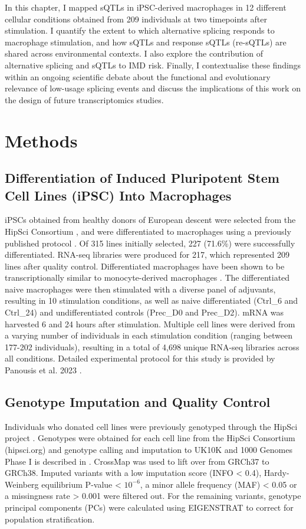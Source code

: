 In this chapter, I mapped sQTLs in iPSC-derived macrophages in 12 different cellular conditions obtained from 209 individuals at two timepoints after stimulation. I quantify the extent to which alternative splicing responds to macrophage stimulation, and how sQTLs and response sQTLs (re-sQTLs) are shared across environmental contexts. I also explore the contribution of alternative splicing and sQTLs to IMD risk. Finally, I contextualise these findings within an ongoing scientific debate about the functional and evolutionary relevance of low-usage splicing events and discuss the implications of this work on the design of future transcriptomics studies. \\
\section{Methods}

\subsection{Differentiation of Induced Pluripotent Stem Cell Lines (iPSC) Into Macrophages}

iPSCs obtained from healthy donors of European descent were selected from the HipSci Consortium \cite{Kilpinen2017-qm}, and were differentiated to macrophages using a previously published protocol \cite{Alasoo2018-pv}. Of 315 lines initially selected, 227 (71.6\%) were successfully differentiated. RNA-seq libraries were produced for 217, which represented 209 lines after quality control. Differentiated macrophages have been shown to be transcriptionally similar to monocyte-derived macrophages \cite{Alasoo2018-pv}. The differentiated naive macrophages were then stimulated with a diverse panel of adjuvants, resulting in 10 stimulation conditions, as well as naive differentiated (Ctrl\_6 and Ctrl\_24) and undifferentiated controls (Prec\_D0 and Prec\_D2). mRNA was harvested 6 and 24 hours after stimulation. Multiple cell lines were derived from a varying number of individuals in each stimulation condition (ranging between 177-202 individuals), resulting in a total of 4,698 unique RNA-seq libraries across all conditions. Detailed experimental protocol for this study is provided by Panousis et al. 2023 \cite{macromap-eqtl}.

\subsection{Genotype Imputation and Quality Control}
Individuals who donated cell lines were previously genotyped through the HipSci project \cite{Kilpinen2017-qm}. Genotypes were obtained for each cell line from the HipSci Consortium  (hipsci.org) and genotype calling and imputation to  UK10K and 1000 Genomes Phase I is described in \cite{Kilpinen2017-qm}. CrossMap \cite{Zhao2014-ve} was used to lift over from GRCh37 to GRCh38. Imputed variants with a low imputation score (INFO < 0.4), Hardy-Weinberg equilibrium P-value < $10^{-6}$, a minor allele frequency (MAF) < 0.05 or a missingness rate > 0.001 were filtered out. For the remaining variants, genotype principal components (PCs) were calculated using EIGENSTRAT \cite{Price2006-kr} to correct for population stratification.

